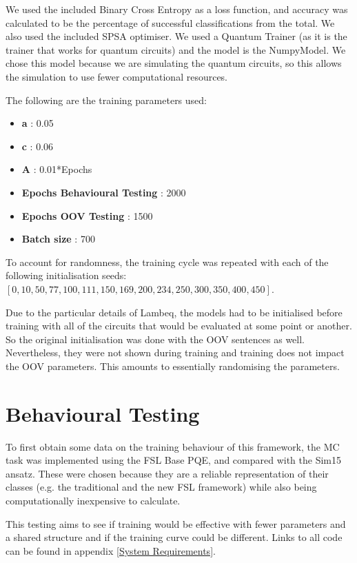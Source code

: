 We used the included Binary Cross Entropy as a loss function, and accuracy was calculated to be the percentage of successful classifications from the total. We also used the included SPSA optimiser. We used a Quantum Trainer (as it is the trainer that works for quantum circuits) and the model is the NumpyModel. We chose this model because we are simulating the quantum circuits, so this allows the simulation to use fewer computational resources. 

The following are the training parameters used:
\begin{itemize}
    \item \textbf{a} : 0.05
    \item \textbf{c} : 0.06
    \item \textbf{A} : 0.01*Epochs
    \item \textbf{Epochs Behavioural Testing} : 2000
    \item \textbf{Epochs OOV Testing} : 1500
    \item \textbf{Batch size} : 700
\end{itemize}
To account for randomness, the training cycle was repeated with each of the following initialisation seeds: $[0, 10, 50, 77, 100, 111, 150, 169, 200, 234, 250, 300, 350, 400, 450]$. 

Due to the particular details of Lambeq, the models had to be initialised before training with all of the circuits that would be evaluated at some point or another. So the original initialisation was done with the OOV sentences as well. Nevertheless, they were not shown during training and training does not impact the OOV parameters. This amounts to essentially randomising the parameters.


\section{Behavioural Testing}

To first obtain some data on the training behaviour of this framework, the MC task was implemented using the FSL Base PQE, and compared with the Sim15 ansatz. These were chosen because they are a reliable representation of their classes (e.g. the traditional and the new FSL framework) while also being computationally inexpensive to calculate. 

This testing aims to see if training would be effective with fewer parameters and a shared structure and if the training curve could be different. Links to all code can be found in appendix \ref{System Requirements}.

